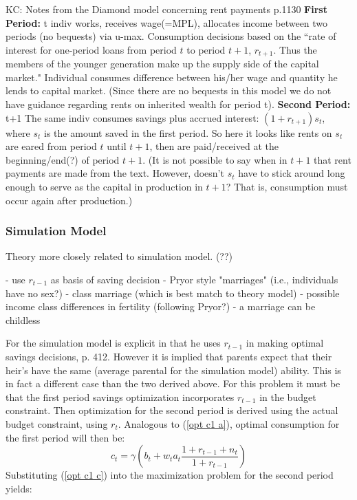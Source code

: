 \documentclass{article}
\begin{document}
KC: Notes from the Diamond model concerning rent payments p.1130\newline
\textbf{First Period:} t\newline
indiv works, receives wage(=MPL), allocates income between two periods (no bequests) via u-max.\newline
Consumption decisions based on the ``rate of interest for one-period loans from period $t$ to period $t+1$, $r_{t+1}$.  Thus the members of the younger generation make up the supply side of the capital market."\newline
Individual consumes difference between his/her wage and quantity he lends to capital market.  (Since there are no bequests in this model we do not have guidance regarding rents on inherited wealth for period t).\newline
\noindent\textbf{Second Period:} t+1 \newline
The same indiv consumes savings plus accrued interest: $(1+r_{t+1})s_t$, where $s_t$ is the amount saved in the first period.  So here it looks like rents on $s_t$ are eared from period $t$ until $t+1$, then are paid/received at the beginning/end(?) of period $t+1$.  (It is not possible to say when in $t+1$ that rent payments are made from the text.  However, doesn't $s_t$ have to stick around long enough to serve as the capital in production in $t+1$?  That is, consumption must occur again after production.)




\subsubsection{Simulation Model}

Theory more closely related to simulation model. (??)

- use $r_{t-1}$ as basis of saving decision
- Pryor style "marriages" (i.e., individuals have no sex?)
- class marriage (which is best match to theory model)
- possible income class differences in fertility (following Pryor?)
- a marriage can be childless


For the simulation model \citet{pestieau-1984-oep} is explicit in that he uses $r_{t-1}$ in making optimal savings decisions, p. 412.  However it is implied that parents expect that their heir's have the same (average parental for the simulation model) ability.  This is in fact a different case than the two derived above.  For this problem it must be that the first period savings optimization incorporates $r_{t-1}$ in the budget constraint.  Then optimization for the second period is derived using the actual budget constraint, using $r_t$.  Analogous to (\ref{opt c1 a}), optimal consumption for the first period will then be:
\begin{equation}\label{opt c1 c}
c_t = \gamma(b_t + w_t a_t\frac{1+r_{t-1}+n_t}{1+r_{t-1}} ) 
\end{equation}
Substituting (\ref{opt c1 c}) into the maximization problem for the second period yields:
\end{document}
